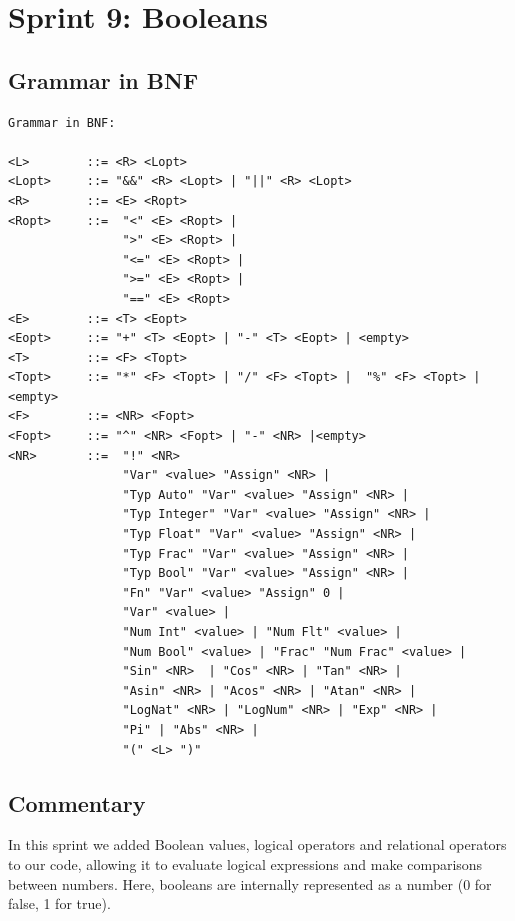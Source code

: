 \documentclass[a4paper, oneside, 11pt]{report}
\begin{document}
	\clearpage
	\section{Sprint 9: Booleans }
	\subsection{Grammar in BNF}
	\begin{verbatim}
Grammar in BNF:

<L>        ::= <R> <Lopt>
<Lopt>     ::= "&&" <R> <Lopt> | "||" <R> <Lopt>
<R>        ::= <E> <Ropt>
<Ropt>     ::=  "<" <E> <Ropt> |
                ">" <E> <Ropt> |
                "<=" <E> <Ropt> |
                ">=" <E> <Ropt> |
                "==" <E> <Ropt>
<E>        ::= <T> <Eopt>
<Eopt>     ::= "+" <T> <Eopt> | "-" <T> <Eopt> | <empty>
<T>        ::= <F> <Topt>
<Topt>     ::= "*" <F> <Topt> | "/" <F> <Topt> |  "%" <F> <Topt> |<empty>
<F>        ::= <NR> <Fopt>
<Fopt>     ::= "^" <NR> <Fopt> | "-" <NR> |<empty>
<NR>       ::=  "!" <NR>
                "Var" <value> "Assign" <NR> |
                "Typ Auto" "Var" <value> "Assign" <NR> |
                "Typ Integer" "Var" <value> "Assign" <NR> |
                "Typ Float" "Var" <value> "Assign" <NR> |
                "Typ Frac" "Var" <value> "Assign" <NR> |
                "Typ Bool" "Var" <value> "Assign" <NR> |
                "Fn" "Var" <value> "Assign" 0 |
                "Var" <value> |
                "Num Int" <value> | "Num Flt" <value> |
                "Num Bool" <value> | "Frac" "Num Frac" <value> |
                "Sin" <NR>  | "Cos" <NR> | "Tan" <NR> |
                "Asin" <NR> | "Acos" <NR> | "Atan" <NR> |
                "LogNat" <NR> | "LogNum" <NR> | "Exp" <NR> |
                "Pi" | "Abs" <NR> |
                "(" <L> ")"
	\end{verbatim}
	\subsection{Commentary}
	In this sprint we added Boolean values, logical operators and relational operators to our code, allowing it to evaluate logical expressions and make comparisons between numbers. Here, booleans are internally represented as a number (0 for false, 1 for true).
\end{document}
